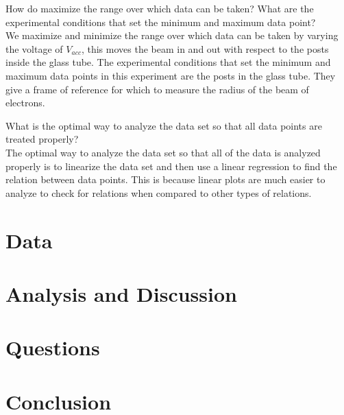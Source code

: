 \documentclass[aps,prl,10pt,twocolumn,floatfix]{revtex4-2}
\begin{document}
How do maximize the range over which data can be taken? What are the experimental conditions that
set the minimum and maximum data point?\\
We maximize and minimize the range over which data can be taken by varying the voltage of $V_{acc}$, this moves the beam in and out with respect to the posts inside the glass tube. 
The experimental conditions that set the minimum and maximum data points in this experiment are the posts in the glass tube. 
They give a frame of reference for which to measure the radius of the beam of electrons. 

What is the optimal way to analyze the data set so that all data points are treated properly?\\
The optimal way to analyze the data set so that all of the data is analyzed properly is to linearize the data set and then use a linear regression to find the relation between data points. 
This is because linear plots are much easier to analyze to check for relations when compared to other types of relations. 

\section{Data}\label{Data}


\section{Analysis and Discussion}


\section{Questions}


\section{Conclusion}


	
\end{document}
